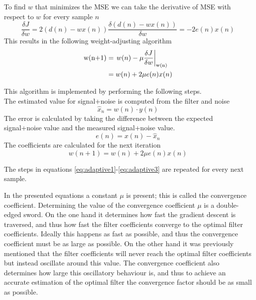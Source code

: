 To find $w$ that minimizes the MSE we can take the derivative of MSE with respect to $w$ for every sample $n$
\begin{equation}
    \frac{\delta J}{\delta w} = 2\left(d(n) - wx(n)\right) \frac{\delta\left(d(n) - wx(n)\right)}{\delta w} = -2e(n)x(n)
\end{equation}
This results in the following weight-adjusting algorithm
\begin{align}
    \textrm{w(n+1)}&=\left.w(n)-\mu \frac{\delta J}{\delta w}\right\rvert_\text{\textrm{w(n)}} \\
    &= w(n) + 2 \mu e(n)x(n)
\end{align}


This algorithm is implemented by performing the following steps. \\
The estimated value for signal+noise is computed from the filter and noise
\begin{equation}\label{eq:adaptive1}
    \hat{x}_n = w(n)\cdot y(n)
\end{equation}
The error is calculated by taking the difference between the expected signal+noise value and the measured signal+noise value.
\begin{equation}\label{eq:adaptive2}
    e(n) = x(n) - \hat{x}_n
\end{equation}
The coefficients are calculated for the next iteration
\begin{equation}\label{eq:adaptive3}
    w(n+1) = w(n) + 2 \mu e(n) x(n)
\end{equation}

The steps in equations \ref{eq:adaptive1}-\ref{eq:adaptive3} are repeated for every next sample.

In the presented equations a constant $\mu$ is present; this is called the convergence coefficient. Determining the value of the convergence coefficient $\mu$ is a double-edged sword. On the one hand it determines how fast the gradient descent is traversed, and thus how fast the filter coefficients converge to the optimal filter coefficients. Ideally this happens as fast as possible, and thus the convergence coefficient must be as large as possible. On the other hand it was previously mentioned that the filter coefficients will never reach the optimal filter coefficients but instead oscillate around this value. The convergence coefficient also determines how large this oscillatory behaviour is, and thus to achieve an accurate estimation of the optimal filter the convergence factor should be as small as possible. 

